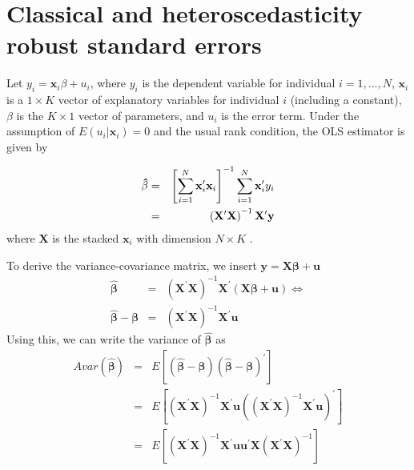 \documentclass{article}
\begin{document}
\section{Classical and heteroscedasticity robust standard errors}

Let $y_{i}=\mathbf{x}_{i}\beta +u_{i}$, where $y_{i}$ is the dependent
variable for individual $i=1,...,N$, $\mathbf{x}_{i}$ is a $1\times K$
vector of explanatory variables for individual $i$ (including a constant), $%
\beta $ is the $K\times 1$ vector of parameters, and $u_{i}$ is the error
term. Under the assumption of $E\left( u_{i}|\mathbf{x}_{i}\right) =0$ and
the usual rank condition, the OLS estimator is given by

\begin{eqnarray*}
\mathbf{\hat{\beta}} &=&\left[ \sum_{i=1}^{N}\mathbf{x}_{i}^{\prime }\mathbf{%
x}_{i}\right] ^{-1}\sum_{i=1}^{N}\mathbf{x}_{i}^{\prime }y_{i} \\
&=&\left( \mathbf{X}^{\prime }\mathbf{X}\right) ^{-1}\mathbf{X}^{\prime }%
\mathbf{y}
\end{eqnarray*}%
where $\mathbf{X}$ is the stacked $\mathbf{x}_{i}$ with dimension $N\times K$%
.

To derive the variance-covariance matrix, we insert $\mathbf{y=X\beta +u}$%
\begin{eqnarray*}
\mathbf{\hat{\beta}} &=&\left( \mathbf{X}^{\prime }\mathbf{X}\right) ^{-1}%
\mathbf{X}^{\prime }\left( \mathbf{X\beta }+\mathbf{u}\right) \Leftrightarrow
\\
\mathbf{\hat{\beta}}-\mathbf{\beta } &=&\left( \mathbf{X}^{\prime }\mathbf{X}%
\right) ^{-1}\mathbf{X}^{\prime }\mathbf{u}
\end{eqnarray*}%
Using this, we can write the variance of $\mathbf{\hat{\beta}}$ as%
\begin{eqnarray*}
Avar\left( \mathbf{\hat{\beta}}\right) &=&E\left[ \left( \mathbf{\hat{\beta}}%
-\mathbf{\beta }\right) \left( \mathbf{\hat{\beta}}-\mathbf{\beta }\right)
^{\prime }\right] \\
&=&E\left[ \left( \mathbf{X}^{\prime }\mathbf{X}\right) ^{-1}\mathbf{X}%
^{\prime }\mathbf{u}\left( \left( \mathbf{X}^{\prime }\mathbf{X}\right) ^{-1}%
\mathbf{X}^{\prime }\mathbf{u}\right) ^{\prime }\right] \\
&=&E\left[ \left( \mathbf{X}^{\prime }\mathbf{X}\right) ^{-1}\mathbf{X}%
^{\prime }\mathbf{uu}^{\prime }\mathbf{X}\left( \mathbf{X}^{\prime }\mathbf{X%
}\right) ^{-1}\right]
\end{eqnarray*}
\end{document}
